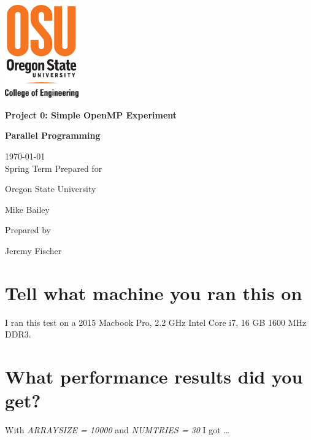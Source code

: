 \documentclass[onecolumn,draftclsnofoot, 10pt, compsoc]{IEEEtran}
\def \GroupNumber{		17}
\def \Jeremy{			Jeremy Fischer}
\def \Class{		Parallel Programming}
\def \Assn{		Project 0: Simple OpenMP Experiment}
\def \School{	Oregon State University}
\def \Professor{		Mike Bailey}
\begin{document}
\begin{titlepage}
    \begin{singlespace}
    	\includegraphics[height=4cm]{coe.eps}
        \hfill  
        \par\vspace{.2in}
        \centering
        \scshape{
            \vspace{.5in}
            \textbf{\Huge\Assn}\par
            \textbf{\Large\Class}\par
            \large{
            	\today \\Spring Term
        	}
            \vfill
            {\large Prepared for}\par
            \huge \School\par
            \vspace{5pt}
            {\Large{\Professor}\par}
            {\large Prepared by }\par
            \vspace{5pt}
            {\Large
                {\Jeremy}\par
            }
            \vspace{20pt}
        }

    \end{singlespace}
\end{titlepage}
\newpage
{}

\clearpage


	\section{Tell what machine you ran this on}	
	I ran this test on a 2015 Macbook Pro, 2.2 GHz Intel Core i7, 16 GB 1600 MHz DDR3.
	
	
	
	\section{ What performance results did you get?}
	With \textit{ARRAYSIZE = 10000} and \textit{NUMTRIES = 30} I got \dots
	
\end{document}
